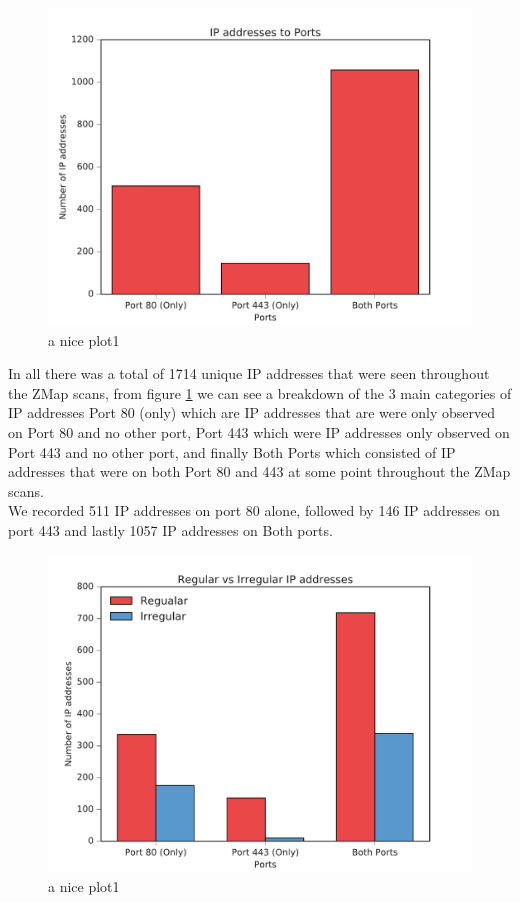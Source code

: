 \documentclass[a4wide,leqno,12pt]{report}
\begin{document}
\begin{figure}[h!]
\includegraphics[scale=.5]{pdf_images/IPaddressestoPorts}
\caption{a nice plot1}
\label{fig:ports}
\end{figure}
In all there was a total of 1714 unique IP addresses that were seen throughout the ZMap scans, from figure \ref{fig:ports} we can see a breakdown of the 3 main categories of IP addresses Port 80 (only) which are IP addresses that are were only observed on Port 80 and no other port, Port 443 which were IP addresses only observed on Port 443 and no other port, and finally Both Ports which consisted of IP addresses that were on both Port 80 and 443 at some point throughout the ZMap scans.\\

We recorded 511 IP addresses on port 80 alone, followed by 146 IP addresses on port 443 and lastly 1057 IP addresses on Both ports.

\begin{figure}[h!]
\includegraphics[scale=.5]{pdf_images/RegularVsIrregularIPaddresses}
\caption{a nice plot1}
\label{fig:portsIrreg}
\end{figure}
\end{document}
